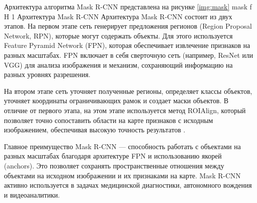Архитектура алгоритма Mask R-CNN представлена на рисунке \ref{img:mask}
	{mask}
	{f}
	{H}
	{1\textwidth}
	{Архитектура Mask R-CNN}
Архитектура Mask R-CNN состоит из двух этапов. На первом этапе сеть генерирует предложения регионов (Region Proposal Network, RPN), которые могут содержать объекты. Для этого используется Feature Pyramid Network (FPN), которая обеспечивает извлечение признаков на разных масштабах. FPN включает в себя сверточную сеть (например, ResNet или VGG) для анализа изображения и механизм, сохраняющий информацию на разных уровнях разрешения.

На втором этапе сеть уточняет полученные регионы, определяет классы объектов, уточняет координаты ограничивающих рамок и создает маски объектов. В отличие от первого этапа, на этом этапе используется метод ROIAlign, который позволяет точно сопоставить области на карте признаков с исходным изображением, обеспечивая высокую точность результатов \cite{maskrcnn}.

Главное преимущество Mask R-CNN — способность работать с объектами на разных масштабах благодаря архитектуре FPN и использованию якорей (anchors). Это позволяет сохранять пространственные отношения между объектами на исходном изображении и их признаками на карте. Mask R-CNN активно используется в задачах медицинской диагностики, автономного вождения и видеоаналитики.

